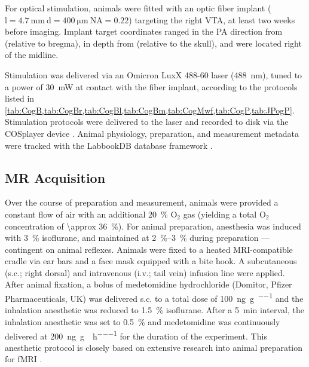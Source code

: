 For optical stimulation, animals were fitted with an optic fiber implant ($\mathrm{l=\SI{4.7}{\milli\meter} \ d=\SI{400}{\micro\meter} \ NA=0.22}$) targeting the right VTA, at least two weeks before imaging.
Implant target coordinates ranged in the PA direction from
 (relative to bregma),
in depth from
 (relative to the skull),
and were located
right of the midline.

Stimulation was delivered via an Omicron LuxX 488-60 laser (\SI{488}{\nano\meter}), tuned to a power of \SI{30}{\milli\watt} at contact with the fiber implant, according to the protocols listed in \cref{tab:CogB,tab:CogBr,tab:CogBl,tab:CogBm,tab:CogMwf,tab:CogP,tab:JPogP}.
Stimulation protocols were delivered to the laser and recorded to disk via the COSplayer device \cite{cosplay}.
Animal physiology, preparation, and measurement metadata were tracked with the LabbookDB database framework \cite{ldb}.

\subsection{MR Acquisition}

Over the course of preparation and measurement, animals were provided a constant flow of air with an additional \SI{20}{\percent} $\mathrm{O_2}$ gas (yielding a total $\mathrm{O_2}$ concentration of \SI{\approx 36}{\percent}).
For animal preparation, anesthesia was induced with \SI{3}{\percent} isoflurane, and maintained at \SIrange{2}{3}{\percent} during preparation --- contingent on animal reflexes.
Animals were fixed to a heated MRI-compatible cradle via ear bars and a face mask equipped with a bite hook.
A subcutaneous (s.c.; right dorsal) and intravenous (i.v.; tail vein) infusion line were applied.
After animal fixation, a bolus of medetomidine hydrochloride (Domitor, Pfizer Pharmaceuticals, UK) was delivered s.c. to a total dose of \SI{100}{\nano\gram\per\gram\per\BW} and the inhalation anesthetic was reduced to \SI{1.5}{\percent} isoflurane.
After a \SI{5}{\minute} interval, the inhalation anesthetic was set to \SI{0.5}{\percent} and medetomidine was continuously delivered at \SI{200}{\nano\gram\per\gram\per\BW\per\hour} for the duration of the experiment.
This anesthetic protocol is closely based on extensive research into animal preparation for fMRI \cite{Grandjean2014}.

